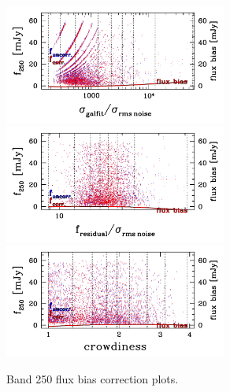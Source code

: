 \documentclass[11pt,a4paper]{article}
\begin{document}
\begin{figure}[H]
	\caption{
	    Band 250 flux bias correction plots.
	}
	\includegraphics[width=0.65\textwidth]{galsim_250_fbias_1}
	\includegraphics[width=0.65\textwidth]{galsim_250_fbias_2}
	\includegraphics[width=0.65\textwidth]{galsim_250_fbias_3}
\end{figure}
\end{document}
